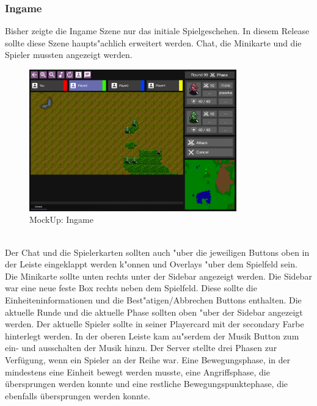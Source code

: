\documentclass[12pt, titlepage]{scrartcl}
\newcounter{subsubsubsection}[subsubsection]
\begin{document}
		    \subsubsection{Ingame}
		        Bisher zeigte die Ingame Szene nur das initiale Spielgeschehen. In diesem Release sollte diese Szene haupts"achlich erweitert werden. Chat, die Minikarte und die Spieler mussten angezeigt werden. \\
		        \begin{figure}[H] 
    				\centering
    				\includegraphics[width=0.8\textwidth]{images/mockUps/Ingame.png}
    				\caption{MockUp: Ingame}
    				\label{Ingame_View}
			    \end{figure}
		    	\ \\   Der Chat und die Spielerkarten sollten auch "uber die jeweiligen Buttons oben in der Leiste eingeklappt werden k"onnen und Overlays "uber dem Spielfeld sein. Die Minikarte sollte unten rechts unter der Sidebar angezeigt werden. Die Sidebar war eine neue feste Box rechts neben dem Spielfeld. Diese sollte die Einheiteninformationen und die Best"atigen/Abbrechen Buttons enthalten. Die aktuelle Runde und die aktuelle Phase sollten oben "uber der Sidebar angezeigt werden. Der aktuelle Spieler sollte in seiner Playercard mit der secondary Farbe hinterlegt werden. In der oberen Leiste kam au"serdem der Musik Button zum ein- und ausschalten der Musik hinzu.
			        Der Server stellte drei Phasen zur Verf\"ugung, wenn ein Spieler an der Reihe war. Eine Bewegungsphase, in der mindestens eine Einheit bewegt werden musste, eine Angriffsphase, die \"ubersprungen werden konnte und eine restliche Bewegungspunktephase, die ebenfalls \"ubersprungen werden konnte. \\
\end{document}
